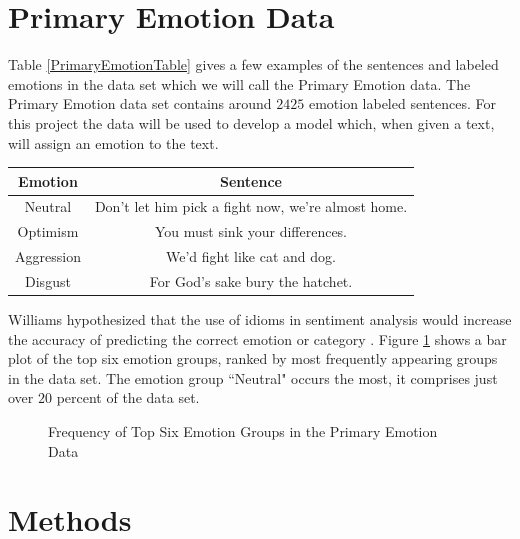 \documentclass[titlepage,letterpaper]{article}
\begin{document}
\section{Primary Emotion Data}
Table \ref{PrimaryEmotionTable} gives a few examples of the sentences and labeled emotions in the data set which we will call the Primary Emotion data. The Primary Emotion data set contains around $2425$ emotion labeled sentences. For this project the data will be used to develop a model which, when given a text, will assign an emotion to the text. 
 
 \begin{center}
 	\begin{tabular}{ |c|c| } 
 		\hline
 		Emotion & Sentence \\
 		\hline \hline
 		Neutral & Don't let him pick a fight now, we're almost home. \\
 		\hline
 		Optimism &  You must sink your differences. \\
 		\hline
 		Aggression & We'd fight like cat and dog.  \\ 
 		\hline
 		Disgust & For God's sake bury the hatchet. \\
 		\hline
 	\end{tabular}
 	\label{PrimaryEmotionTable}
 \end{center}

 
 Williams hypothesized that the use of idioms in sentiment analysis would increase the accuracy of predicting the correct emotion or category \cite{lowriwilliams}. Figure \ref{topsixgroups} shows a bar plot of the top six emotion groups, ranked by most frequently appearing groups in the data set. The emotion group ``Neutral" occurs the most, it comprises just over $20$ percent of the data set. 
 
 

 \begin{figure}[htb]
		\centering
 		\caption{Frequency of Top Six Emotion Groups in the Primary Emotion Data}
 		
 		\label{topsixgroups}
 \end{figure}
 	
 
\section{Methods}
\end{document}
